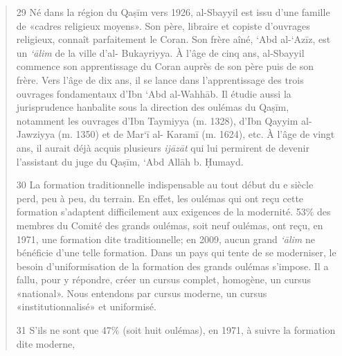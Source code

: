 \begin{quote}
29 Né dans la région du Qaṣīm vers 1926, al-Sbayyil est issu d'une
famille de «cadres religieux moyens». Son père, libraire et copiste
d'ouvrages religieux, connaît parfaitement le Coran. Son frère aîné,
`Abd al-`Azīz, est un \emph{`ālim} de la ville d'al- Bukayriyya. À l'âge
de cinq ans, al-Sbayyil commence son apprentissage du Coran auprès de
son père puis de son frère. Vers l'âge de dix ans, il se lance dans
l'apprentissage des trois ouvrages fondamentaux d'Ibn `Abd al-Wahhāb. Il
étudie aussi la jurisprudence hanbalite sous la direction des oulémas du
Qaṣīm, notamment les ouvrages d'Ibn Taymiyya (m. 1328), d'Ibn Qayyim
al-Jawziyya (m. 1350) et de Mar`ī al- Karamī (m. 1624), etc. À l'âge de
vingt ans, il aurait déjà acquis plusieurs \emph{ijāzāt} qui lui
permirent de devenir l'assistant du juge du Qaṣīm, `Abd Allāh b. Ḥumayd.

30 La formation traditionnelle indispensable au tout début du e siècle
perd, peu à peu, du terrain. En effet, les oulémas qui ont reçu cette
formation s'adaptent difficilement aux exigences de la modernité. 53\%
des membres du Comité des grands oulémas, soit neuf oulémas, ont reçu,
en 1971, une formation dite traditionnelle; en 2009, aucun grand
\emph{`ālim} ne bénéficie d'une telle formation. Dans un pays qui tente
de se moderniser, le besoin d'uniformisation de la formation des grands
oulémas s'impose. Il a fallu, pour y répondre, créer un cursus complet,
homogène, un cursus «national». Nous entendons par cursus moderne, un
cursus «institutionnalisé» et uniformisé.

31 S'ils ne sont que 47\% (soit huit oulémas), en 1971, à suivre la
formation dite moderne,


\end{quote}
